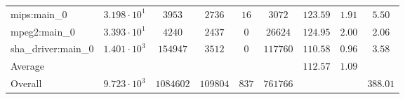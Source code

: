 \begin{tabular}{|l|c|c|c|c|c|c|c|c|}
mips:main\_0            & $ 3.198 \cdot 10^{1} $ & $ 3953    $ & $ 2736   $ & $ 16  $ & $ 3072   $ & $ 123.59      $ & $ 1.91    $ & $ 5.50    $ \\
mpeg2:main\_0           & $ 3.393 \cdot 10^{1} $ & $ 4240    $ & $ 2437   $ & $ 0   $ & $ 26624  $ & $ 124.95      $ & $ 2.00    $ & $ 2.06    $ \\
sha\_driver:main\_0     & $ 1.401 \cdot 10^{3} $ & $ 154947  $ & $ 3512   $ & $ 0   $ & $ 117760 $ & $ 110.58      $ & $ 0.96    $ & $ 3.58    $ \\
\hline
Average                 & $                    $ & $         $ & $        $ & $     $ & $        $ & $ 112.57      $ & $ 1.09    $ & $         $ \\
\hline
Overall                 & $ 9.723 \cdot 10^{3} $ & $ 1084602 $ & $ 109804 $ & $ 837 $ & $ 761766 $ & $             $ & $         $ & $ 388.01  $ \\
\hline
\end{tabular}
